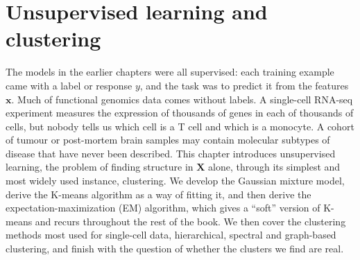 
\providecommand{\R}{\mathbb{R}}
\providecommand{\E}{\mathbb{E}}
\providecommand{\Normal}{\mathcal{N}}
\providecommand{\argmax}{\operatorname*{arg\,max}}
\providecommand{\argmin}{\operatorname*{arg\,min}}
\providecommand{\vy}{\mathbf{y}}
\providecommand{\vx}{\mathbf{x}}
\providecommand{\mX}{\mathbf{X}}
\providecommand{\mI}{\mathbf{I}}
\providecommand{\vb}{\boldsymbol{\beta}}
\providecommand{\veps}{\boldsymbol{\epsilon}}
\providecommand{\vp}{\mathbf{p}}
\providecommand{\vg}{\mathbf{g}}
\providecommand{\ind}{\mathbf{1}}
\providecommand{\vmu}{\boldsymbol{\mu}}
\providecommand{\vpi}{\boldsymbol{\pi}}
\providecommand{\vc}{\mathbf{c}}
\providecommand{\vf}{\mathbf{f}}
\providecommand{\vu}{\mathbf{u}}
\providecommand{\mSigma}{\boldsymbol{\Sigma}}
\providecommand{\mA}{\mathbf{A}}
\providecommand{\mD}{\mathbf{D}}
\providecommand{\mL}{\mathbf{L}}
\providecommand{\mU}{\mathbf{U}}
\providecommand{\mLambda}{\boldsymbol{\Lambda}}
\providecommand{\KL}{\operatorname{KL}}

\providecommand{\chaptertoc}{}
\chapter{Unsupervised learning and clustering}
\label{ch:clustering}
\chaptertoc

The models in the earlier chapters were all supervised: each training example came with a label or response $y$, and the task was to predict it from the features $\vx$. Much of functional genomics data comes without labels. A single-cell RNA-seq experiment measures the expression of thousands of genes in each of thousands of cells, but nobody tells us which cell is a T cell and which is a monocyte. A cohort of tumour or post-mortem brain samples may contain molecular subtypes of disease that have never been described. This chapter introduces unsupervised learning, the problem of finding structure in $\mX$ alone, through its simplest and most widely used instance, clustering. We develop the Gaussian mixture model, derive the K-means algorithm as a way of fitting it, and then derive the expectation-maximization (EM) algorithm, which gives a ``soft'' version of K-means and recurs throughout the rest of the book. We then cover the clustering methods most used for single-cell data, hierarchical, spectral and graph-based clustering, and finish with the question of whether the clusters we find are real.

